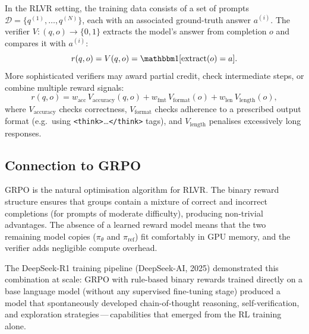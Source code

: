 In the RLVR setting, the training data consists of a set of prompts $\mathcal{D} = \{q^{(1)}, \ldots, q^{(N)}\}$, each with an associated ground-truth answer $a^{(i)}$.  The verifier $V: (q, o) \to \{0, 1\}$ extracts the model's answer from completion $o$ and compares it with $a^{(i)}$:
\begin{equation}
\label{eq:rlvr-reward}
r(q, o) = V(q, o) = \ind[\text{extract}(o) = a].
\end{equation}
More sophisticated verifiers may award partial credit, check intermediate steps, or combine multiple reward signals:
\begin{equation}
\label{eq:rlvr-composite}
r(q, o) = w_\mathrm{acc}\, V_\mathrm{accuracy}(q, o) + w_\mathrm{fmt}\, V_\mathrm{format}(o) + w_\mathrm{len}\, V_\mathrm{length}(o),
\end{equation}
where $V_\mathrm{accuracy}$ checks correctness, $V_\mathrm{format}$ checks adherence to a prescribed output format (e.g.\ using \texttt{<think>}\ldots\texttt{</think>} tags), and $V_\mathrm{length}$ penalises excessively long responses.

\subsection{Connection to GRPO}

GRPO is the natural optimisation algorithm for RLVR.  The binary reward structure ensures that groups contain a mixture of correct and incorrect completions (for prompts of moderate difficulty), producing non-trivial advantages.  The absence of a learned reward model means that the two remaining model copies ($\pi_\theta$ and $\pi_\mathrm{ref}$) fit comfortably in GPU memory, and the verifier adds negligible compute overhead.

The DeepSeek-R1 training pipeline (DeepSeek-AI, 2025) demonstrated this combination at scale: GRPO with rule-based binary rewards trained directly on a base language model (without any supervised fine-tuning stage) produced a model that spontaneously developed chain-of-thought reasoning, self-verification, and exploration strategies\,---\,capabilities that emerged from the RL training alone.

